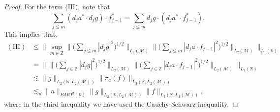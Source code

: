 \documentclass[oneside,english,a4wide]{amsart}
\numberwithin{equation}{section}
\numberwithin{figure}{section}
\theoremstyle{plain}
\theoremstyle{plain}
\theoremstyle{definition}
\theoremstyle{plain}
\theoremstyle{remark}
\theoremstyle{definition}
\theoremstyle{remark}
\theoremstyle{definition}
\newcommand{\8}{\infty}
\begin{document}
\begin{proof}
	For the term $\text{(III)}$, note that
	$$ \sum_{j\le m}(d_ja^*\cdot d_jg)\cdot f_{j-1}^*=\sum_{j\le m}d_jg\cdot (d_ja^*\cdot f_{j-1}^*).  $$
	This implies that,
	\begin{equation}\label{III}
		\begin{aligned}
			(\text{III}){}&\leq \biggl\| \sup_{m\in\mathbb{Z}}\biggl\| \biggl(\sum_{j\leq m}|d_jg|^2\biggr)^{1/2}\biggr\|_{L_2(\mathcal{M})}\biggl\|\biggl(\sum_{j\leq m}|d_ja\cdot f_{j-1}|^2\biggr)^{1/2}\biggr\|_{L_2(\mathcal{M})}\biggr\|_{L_1(\mathbb{R})}\\
			&= \biggl\| \biggl\|\biggl(\sum_{j\in\mathbb{Z}}|d_jg|^2\biggr)^{1/2}\biggr\|_{L_2(\mathcal{M})}\biggl\|\biggl(\sum_{j\in\mathbb{Z}}|d_ja\cdot f_{j-1}|^2\biggr)^{1/2}\biggr\|_{L_2(\mathcal{M})}\biggr\|_{L_1(\mathbb{R})}\\
			&\lesssim \|g\|_{L_2(\mathbb{R},L_2(\mathcal{M}))}\|\pi_a(f)\|_{L_2(\mathbb{R},L_2(\mathcal{M}))}\\
			&\lesssim_d \|a\|_{BMO^d(\mathbb{R})}\|g\|_{L_2(\mathbb{R},L_2(\mathcal{M}))}\|f\|_{L_2(\mathbb{R},L_2(\mathcal{M}))},
		\end{aligned}
	\end{equation}
	where in the third inequality we have used the Cauchy-Schwarz inequality.
	
	
	
	

\end{proof}
\end{document}
